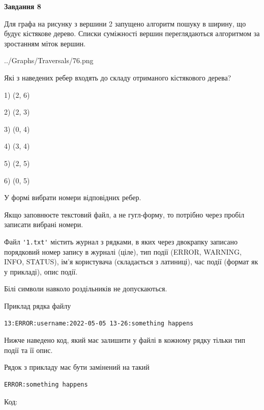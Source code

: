 \documentclass[12pt, ukrainian]{article}
\def\code#1{\Verb!#1!}
\begin{document}
{\begin {large}
{\begin {center}\textbf{Завдання 8}\end {center}}\par
Для графа на рисунку з вершини 2 запущено алгоритм пошуку в ширину, що будує кістякове дерево. Списки суміжності вершин переглядаються алгоритмом за зростанням міток вершин.\par
\begin{center}
	{../Graphs/Traversals/76.png}
\end{center}
\par Які з наведених ребер входять до складу отриманого кістякового дерева?\par
1) (2, 6)\par
2) (2, 3)\par
3) (0, 4)\par
4) (3, 4)\par
5) (2, 5)\par
6) (0, 5)\par
{\vskip 15pt} У формі вибрати номери відповідних ребер.


Якщо заповнюєте текстовий файл, а не гугл-форму, то потрібно через пробіл записа\-ти вибрані номери.\par
\newpage


Файл \code{'1.txt'} містить журнал з рядками, в яких через двокрапку записано поряд\-ко\-вий номер запису в журналі (ціле), тип події (ERROR, WARNING, INFO, STATUS), ім'я користувача (складається з латиниці), час події (фор\-мат як у прикладі), опис події.

Білі символи навколо роздільників не допускаються.

Приклад рядка файлу



\begin{verbatim}
13:ERROR:username:2022-05-05 13-26:something happens
\end{verbatim}


Нижче наведено код, який має залишити у файлі в кожному рядку тільки тип події та її опис.

Рядок з прикладу має бути замінений на такий



\begin{verbatim}
ERROR:something happens
\end{verbatim}




Код:




\end{large}}
\end{document}
